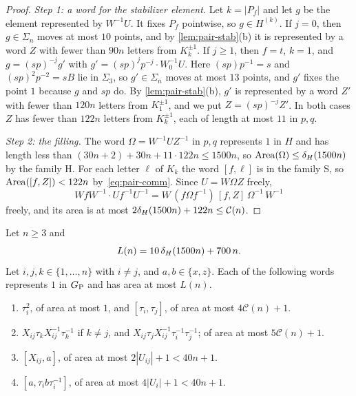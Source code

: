 \begin{proof}
\emph{Step 1: a word for the stabilizer element.} Let $k=|P_f|$ and let $g$ be the element represented by $W^{-1}U$. It fixes $P_f$
pointwise, so $g\in H^{(k)}$. If $j=0$, then $g\in\Sigma_n$ moves at most $10$ points, and by \cref{lem:pair-stab}(b) it is represented by a
word $Z$ with fewer than $90n$ letters from $K_k^{\pm1}$. If $j\ge1$, then $f=t$, $k=1$, and $g=(sp)^{-j}g'$ with
$g'=(sp)^jp^{-j}\cdot W_0^{-1}U$. Here $(sp)p^{-1}=s$ and $(sp)^2p^{-2}=sB$ lie in $\Sigma_3$, so $g'\in\Sigma_n$ moves at most $13$ points,
and $g'$ fixes the point $1$ because $g$ and $sp$ do. By \cref{lem:pair-stab}(b), $g'$ is represented by a word $Z'$ with fewer than $120n$
letters from $K_1^{\pm1}$, and we put $Z=(sp)^{-j}Z'$. In both cases $Z$ has fewer than $122n$ letters from $K_k^{\pm1}$, each of length at
most $11$ in $p,q$.

\emph{Step 2: the filling.} The word $\Omega=W^{-1}UZ^{-1}$ in $p,q$ represents $1$ in $H$ and has length less than
$(30n+2)+30n+11\cdot122n\le1500n$, so $\operatorname{Area}(\Omega)\le\delta_{H}(1500n)$ by the family \textsf{H}. For each letter $\ell$ of $K_k$ the word
$[f,\ell]$ is in the family \textsf{S}, so $\operatorname{Area}([f,Z])<122n$ by~\eqref{eq:pair-comm}. Since $U=W\Omega Z$ freely,
\[
WfW^{-1}\cdot Uf^{-1}U^{-1}=W\,(f\Omega f^{-1})\,[f,Z]\,\Omega^{-1}\,W^{-1}
\]
freely, and its area is at most $2\delta_{H}(1500n)+122n\le\mathcal C(n)$.
\end{proof}

\begin{lemma}\label{lem:local-filling}
Let $n\ge3$ and
\[
L(n)=10\,\delta_{H}(1500n)+700\,n .
\]
Let $i,j,k\in\{1,\dots,n\}$ with $i\ne j$, and $a,b\in\{x,z\}$. Each of the following words represents $1$ in $G_{\mathrm P}$ and has area at most
$L(n)$.
\begin{enumerate}[label=(\alph*),itemsep=1pt]
\item $\tau_i^2$, of area at most $1$, and $[\tau_i,\tau_j]$, of area at most $4\mathcal C(n)+1$.
\item $X_{ij}\tau_kX_{ij}^{-1}\tau_k^{-1}$ if $k\ne j$, and $X_{ij}\tau_jX_{ij}^{-1}\tau_i^{-1}\tau_j^{-1}$; of area at most
$5\mathcal C(n)+1$.
\item $[X_{ij},a]$, of area at most $2|U_{ij}|+1<40n+1$.
\item $[a,\tau_ib\tau_i^{-1}]$, of area at most $4|U_i|+1<40n+1$.
\end{enumerate}
\end{lemma}

